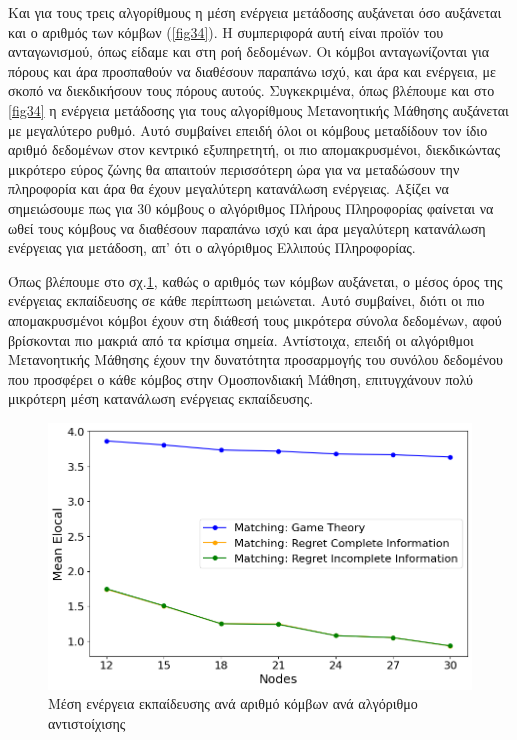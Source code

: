 Και για τους τρεις αλγορίθμους η μέση ενέργεια μετάδοσης αυξάνεται όσο αυξάνεται και ο αριθμός των κόμβων (\ref{fig34}). Η συμπεριφορά αυτή είναι προϊόν του ανταγωνισμού, όπως είδαμε και στη ροή δεδομένων. Οι κόμβοι ανταγωνίζονται για πόρους και άρα προσπαθούν να διαθέσουν παραπάνω ισχύ, και άρα και ενέργεια, με σκοπό να διεκδικήσουν τους πόρους αυτούς. Συγκεκριμένα, όπως βλέπουμε και στο \ref{fig34} η ενέργεια μετάδοσης για τους αλγορίθμους Μετανοητικής Μάθησης αυξάνεται με μεγαλύτερο ρυθμό. Αυτό συμβαίνει επειδή όλοι οι κόμβους μεταδίδουν τον ίδιο αριθμό δεδομένων στον κεντρικό εξυπηρετητή, οι πιο απομακρυσμένοι, διεκδικώντας μικρότερο εύρος ζώνης θα απαιτούν περισσότερη ώρα για να μεταδώσουν την πληροφορία και άρα θα έχουν μεγαλύτερη κατανάλωση ενέργειας. Αξίζει να σημειώσουμε πως για 30 κόμβους ο αλγόριθμος Πλήρους Πληροφορίας φαίνεται να ωθεί τους κόμβους να διαθέσουν παραπάνω ισχύ και άρα μεγαλύτερη κατανάλωση ενέργειας για μετάδοση, απ' ότι ο αλγόριθμος Ελλιπούς Πληροφορίας.

Όπως βλέπουμε στο σχ.\ref{fig35}, καθώς ο αριθμός των κόμβων αυξάνεται, ο μέσος όρος της ενέργειας εκπαίδευσης σε κάθε περίπτωση μειώνεται. Αυτό συμβαίνει, διότι οι πιο απομακρυσμένοι κόμβοι έχουν στη διάθεσή τους μικρότερα σύνολα δεδομένων, αφού βρίσκονται πιο μακριά από τα κρίσιμα σημεία. Αντίστοιχα, επειδή οι αλγόριθμοι Μετανοητικής Μάθησης έχουν την δυνατότητα προσαρμογής του συνόλου δεδομένου που προσφέρει ο κάθε κόμβος στην Ομοσπονδιακή Μάθηση, επιτυγχάνουν πολύ μικρότερη μέση κατανάλωση ενέργειας εκπαίδευσης. 

\newpage

\begin{figure}[H]
    \centering
    \includegraphics[width=\textwidth]{figures/chapter4/Mean_Elocal_vs_Users.png}
    \caption{Μέση ενέργεια εκπαίδευσης ανά αριθμό κόμβων ανά αλγόριθμο αντιστοίχισης}
    \label{fig35}
\end{figure}

